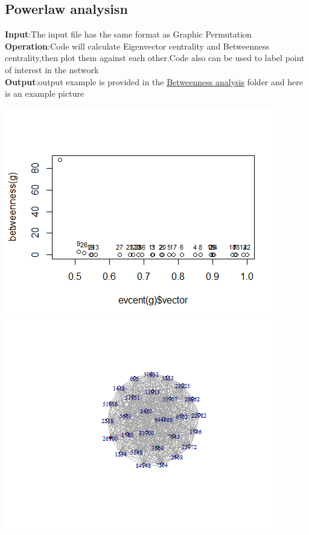 \documentclass[doublespaced, 12pt]{article}
\begin{document}
\subsection{Powerlaw analysisn}
\textbf{Input}:The input file has the same format as Graphic Permutation\\
\textbf{Operation}:Code will calculate Eigenvector centrality and Betweenness centrality,then plot them against each other.Code also can be used to label point of interest in the network \\
\textbf{Output}:output example is provided in the \underline{Betweenness analysis} folder and here is an example picture 
\begin{center}
\includegraphics[scale=0.8]{outputscatterplot}
\includegraphics[scale=0.8]{outputimage}
\end{center}
\end{document}
